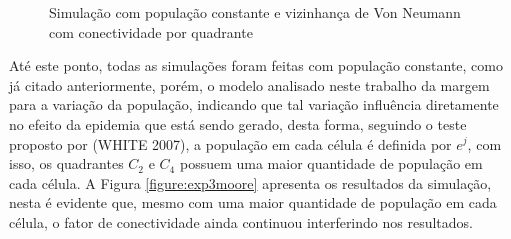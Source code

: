 \documentclass[a4paper,12pt]{article}
\begin{document}
\begin{figure}[!ht]
\qquad
{}
\qquad
{}
\caption{Simulação com população constante e vizinhança de Von Neumann com conectividade por quadrante}
\label{figure:exp2vonneumann}
\end{figure}

Até este ponto, todas as simulações foram feitas com população constante, como já citado anteriormente, porém, o modelo analisado neste trabalho da margem para a variação da população, indicando que tal variação influência diretamente no efeito da epidemia que está sendo gerado, desta forma, seguindo o teste proposto por (WHITE 2007\cite{White2007}), a população em cada célula é definida por $e^j$, com isso, os quadrantes $C_2$ e $C_4$ possuem uma maior quantidade de população em cada célula. A Figura \ref{figure:exp3moore} apresenta os resultados da simulação, nesta é evidente que, mesmo com uma maior quantidade de população em cada célula, o fator de conectividade ainda continuou interferindo nos resultados.
\end{document}
